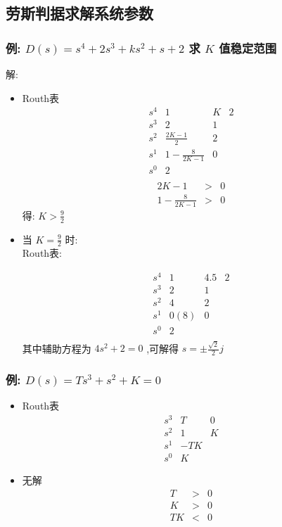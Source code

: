 \documentclass{article}
\begin{document}
\subsection{劳斯判据求解系统参数}
\label{sec-2-5}
\begin{frame}
\frametitle{例: $D(s)=s^{4}+2s^{3}+ks^{2}+s+2$ 求 $K$ 值稳定范围}
\label{sec-2-5-1}


解:
\begin{itemize}

\item Routh表\\
\label{sec-2-5-1-1}%
\[
\begin{matrix}
s^{4} & 1 & K & 2\\
s^{3} & 2 & 1 \\
s^{2} & \frac{2K-1}{2} & 2\\
s^{1} & 1-\frac{8}{2K-1} & 0 \\
s^{0} & 2 \\
\end{matrix}
\]
\begin{eqnarray*}
2K-1 & > & 0 \\
1-\frac{8}{2K-1} &>& 0  
\end{eqnarray*}
得: $K>\frac{9}{2}$


\item 当 $K=\frac{9}{2}$ 时:\\
\label{sec-2-5-1-2}%
Routh表:

$$
\begin{matrix}
s^{4} & 1 & 4.5 & 2\\
s^{3} & 2 & 1 \\
s^{2} & 4 & 2\\
s^{1} & 0(8) & 0 \\
s^{0} & 2 \\
\end{matrix}
$$
其中辅助方程为 $4s^{2}+2=0$ ,可解得 $s=\pm\frac{\sqrt{2}}{2}j$ 

\end{itemize} %
\end{frame}
\begin{frame}
\frametitle{例: $D(s)=Ts^{3}+s^{2}+K=0$}
\label{sec-2-5-2}
\begin{itemize}

\item Routh表\\
\label{sec-2-5-2-1}%
\[
\begin{matrix}
s^{3} & T  & 0\\
s^{2} & 1  & K \\
s^{1} & -TK \\
s^{0} & K 
\end{matrix}
\]


\item 无解
\label{sec-2-5-2-2}%
\begin{eqnarray*}
T & > & 0 \\
K & > & 0 \\
TK& < & 0 
\end{eqnarray*}

\end{itemize} %
\end{frame}
\end{document}
